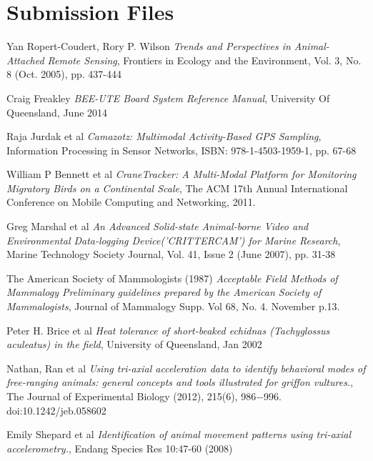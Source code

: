 \documentclass[12pt,openany,a4paper]{book}
\begin{document}
\chapter{Submission Files}

\cleardoublepage


\begin{thebibliography}{99}
	Yan Ropert-Coudert, Rory P. Wilson
	\emph{Trends and Perspectives in Animal-Attached Remote Sensing},
	Frontiers in Ecology and the Environment,
	Vol. 3, No. 8 (Oct. 2005), pp. 437-444
	
	Craig Freakley
	\emph{BEE-UTE Board System Reference Manual},
	University Of Queensland, June 2014
	
	Raja Jurdak et al
	\emph{Camazotz: Multimodal Activity-Based GPS Sampling},
	Information Processing in Sensor Networks,
	ISBN: 978-1-4503-1959-1, pp. 67-68
	
	William P Bennett et al
	\emph{CraneTracker: A Multi-Modal Platform for Monitoring Migratory Birds on a Continental Scale},
	The ACM 17th Annual International Conference on Mobile Computing and Networking, 2011.
	
	Greg Marshal et al
	\emph{An Advanced Solid-state Animal-borne Video and Environmental Data-logging Device('CRITTERCAM') for Marine Research},
	Marine Technology Society Journal,
	Vol. 41, Issue 2 (June 2007), pp. 31-38
	
	The American Society of Mammologists (1987) \emph{Acceptable Field Methods of Mammalogy Preliminary guidelines prepared by the American Society of Mammalogists},
	Journal of Mammalogy Supp. Vol 68, No. 4. November p.13.
	
	Peter H. Brice et al
	\emph{Heat tolerance of short-beaked echidnas (Tachyglossus aculeatus) in the field},
	University of Queensland, Jan 2002
	
	Nathan, Ran et al
	\emph{Using tri-axial acceleration data to identify behavioral modes of free-ranging animals: general concepts and tools illustrated for griffon vultures.},
	The Journal of Experimental Biology (2012), 215(6), 986$-$996. doi:10.1242/jeb.058602
	
	Emily Shepard et al
	\emph{Identification of animal movement patterns using tri-axial accelerometry.},
	Endang Species Res 10:47-60 (2008)
	

\end{thebibliography}
\end{document}
